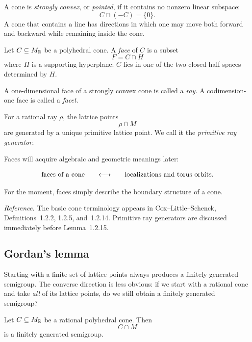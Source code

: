 A cone is \emph{strongly convex}, or \emph{pointed}, if it contains no
nonzero linear subspace:
\[
C\cap(-C)=\{0\}.
\]
A cone that contains a line has directions in which one may move both
forward and backward while remaining inside the cone.

\begin{definition}
Let \(C\subseteq M_{\mathbb{R}}\) be a polyhedral cone. A \emph{face} of
\(C\) is a subset
\[
F=C\cap H
\]
where \(H\) is a supporting hyperplane: \(C\) lies in one of the two
closed half-spaces determined by \(H\).

A one-dimensional face of a strongly convex cone is called a
\emph{ray}. A codimension-one face is called a \emph{facet}.
\end{definition}

For a rational ray \(\rho\), the lattice points
\[
\rho\cap M
\]
are generated by a unique primitive lattice point. We call it the
\emph{primitive ray generator}.

\begin{observation}
Faces will acquire algebraic and geometric meanings later:

\[
\begin{array}{c@{\qquad\longleftrightarrow\qquad}c}
\text{faces of a cone}
&
\text{localizations and torus orbits}.
\end{array}
\]

For the moment, faces simply describe the boundary structure of a
cone.
\end{observation}

\noindent
\textit{Reference.}
The basic cone terminology appears in Cox--Little--Schenck,
Definitions~1.2.2, 1.2.5, and~1.2.14. Primitive ray generators are
discussed immediately before Lemma~1.2.15.

\subsection{Gordan's lemma}

Starting with a finite set of lattice points always produces a
finitely generated semigroup. The converse direction is less obvious:
if we start with a rational cone and take \emph{all} of its lattice
points, do we still obtain a finitely generated semigroup?

\begin{theorem}
\label{thm:gordans-lemma-character-cone}
Let \(C\subseteq M_{\mathbb{R}}\) be a rational polyhedral cone. Then
\[
C\cap M
\]
is a finitely generated semigroup.
\end{theorem}


